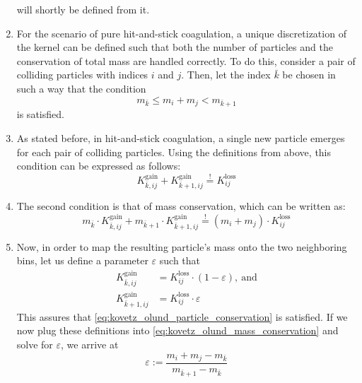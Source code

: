\begin{enumerate}
                will shortly be defined from it.
            \item For the scenario of pure hit-and-stick coagulation, a unique discretization
                of the kernel can be defined such that both the number of particles and the
                conservation of total mass are handled correctly. To do this, consider a
                pair of colliding particles with indices $i$ and $j$. Then, let the index
                $\bar k$ be chosen in such a way that the condition
                \begin{equation}
                    m_{\bar k} \leq m_i + m_j < m_{\bar k+1}
                \end{equation}
                is satisfied.
            \item As stated before, in hit-and-stick coagulation, a single new particle emerges
                for each pair of colliding particles. Using the definitions from above, this
                condition can be expressed as follows:
                \begin{equation}
                    \label{eq:kovetz_olund_particle_conservation}
                    K_{\bar k,ij}^\text{gain} + K_{\bar k+1,ij}^\text{gain}
                    \overset{!}{=} K_{ij}^\text{loss}
                \end{equation}
            \item The second condition is that of mass conservation, which can be written as:
                \begin{equation}
                    \label{eq:kovetz_olund_mass_conservation}
                    m_{\bar k} \cdot K_{\bar k,ij}^\text{gain}
                    + m_{\bar k+1} \cdot K_{\bar k+1,ij}^\text{gain}
                    \overset{!}{=} (m_i+m_j) \cdot K_{ij}^\text{loss}
                \end{equation}
            \item Now, in order to map the resulting particle's mass onto the two 
                neighboring bins, let us define a parameter $\varepsilon$ such that
                \begin{align}
                    \label{eq:definition_of_kovetz_olund_epsilon_parameter}
                    K_{\bar k,ij}^\text{gain}
                        &=K_{ij}^\text{loss} \cdot (1-\varepsilon),\ \text{and}\\
                    K_{\bar k+1,ij}^\text{gain}
                        &=K_{ij}^\text{loss} \cdot \varepsilon
                \end{align}
                This assures that \cref{eq:kovetz_olund_particle_conservation} is satisfied. 
                If we now plug these definitions into \cref{eq:kovetz_olund_mass_conservation} 
                and solve for $\varepsilon$, we arrive at
                \begin{equation}
                    \varepsilon
                        :=\frac{m_i+m_j-m_{\bar k}}{m_{\bar k+1}-m_{\bar k}}
                \end{equation}
        \end{enumerate}
